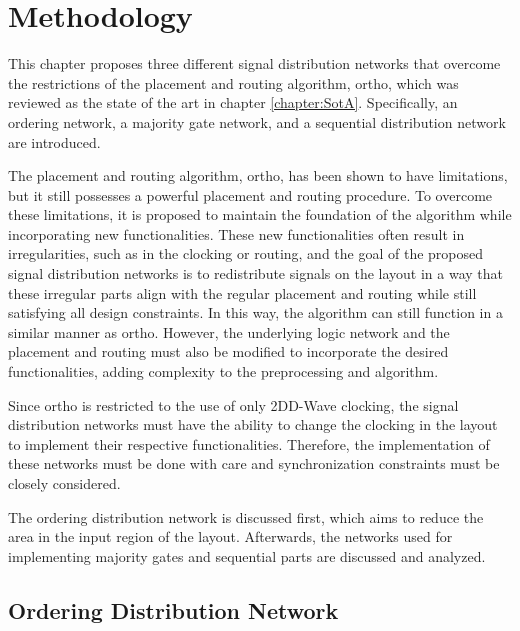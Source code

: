 \chapter{Methodology}\label{chapter:Methodology}
This chapter proposes three different signal distribution networks that overcome the restrictions of the placement and routing algorithm, ortho, which was reviewed as the state of the art in chapter \ref{chapter:SotA}. Specifically, an ordering network, a majority gate network, and a sequential distribution network are introduced.

The placement and routing algorithm, ortho, has been shown to have limitations, but it still possesses a powerful placement and routing procedure. To overcome these limitations, it is proposed to maintain the foundation of the algorithm while incorporating new functionalities. These new functionalities often result in irregularities, such as in the clocking or routing, and the goal of the proposed signal distribution networks is to redistribute signals on the layout in a way that these irregular parts align with the regular placement and routing while still satisfying all design constraints. In this way, the algorithm can still function in a similar manner as ortho. However, the underlying logic network and the placement and routing must also be modified to incorporate the desired functionalities, adding complexity to the preprocessing and algorithm.

Since ortho is restricted to the use of only 2DD-Wave clocking, the signal distribution networks must have the ability to change the clocking in the layout to implement their respective functionalities. Therefore, the implementation of these networks must be done with care and synchronization constraints must be closely considered.

The ordering distribution network is discussed first, which aims to reduce the area in the input region of the layout. Afterwards, the networks used for implementing majority gates and sequential parts are discussed and analyzed.

\section{Ordering Distribution Network}

